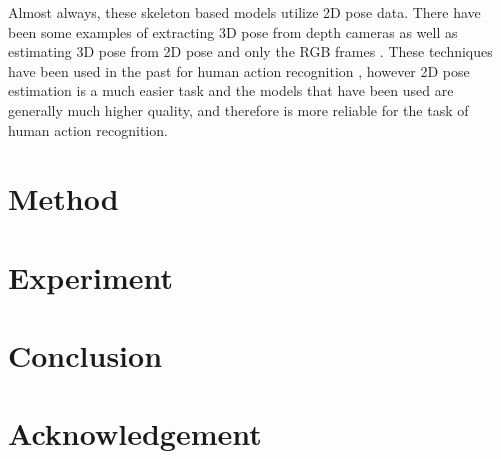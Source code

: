 \documentclass[10pt,twocolumn,letterpaper]{article}
\begin{document}
Almost always, these skeleton based models utilize 2D pose data. There have been some examples of extracting 3D pose from depth cameras \cite{depthcamera3dpose} as well as estimating 3D pose from 2D pose \cite{3dposefrom2d} and only the RGB frames \cite{2dposefromrgb}. These techniques have been used in the past for human action recognition \cite{3dposeactionrecognition}, however 2D pose estimation is a much easier task and the models that have been used are generally much higher quality, and therefore is more reliable for the task of human action recognition.

\section{Method}
\label{sec:method}

\section{Experiment}
\label{sec:experiment}

\section{Conclusion}
\label{sec:conclusion}

\section{Acknowledgement}
\label{sec:acknowledgement}

{\small


}
\end{document}
